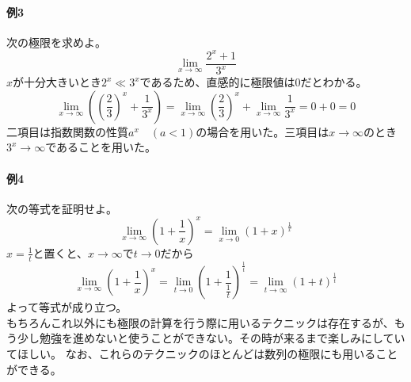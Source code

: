 \documentclass[a4j,dvipdfmx]{jsarticle}
\begin{document}
                \paragraph{例3}次の極限を求めよ。
                    \begin{equation*}
                        \lim_{x\to\infty}\frac{2^x+1}{3^x}
                    \end{equation*}
                    $x$が十分大きいとき$2^x\ll 3^x$であるため、直感的に極限値は0だとわかる。
                    \begin{equation*}
                        \lim_{x\to\infty}\left(\left(\frac{2}{3}\right)^x+\frac{1}{3^x}\right)=\lim_{x\to\infty}\left(\frac{2}{3}\right)^x+\lim_{x\to\infty}\frac{1}{3^x}=0+0=0
                    \end{equation*}
                    二項目は指数関数の性質$a^x\quad(a<1)$の場合を用いた。三項目は$x\to\infty$のとき$3^x\to\infty$であることを用いた。

                \paragraph{例4}次の等式を証明せよ。
                    \begin{equation*}
                        \lim_{x\to \infty}\left(1+\frac{1}{x}\right)^x = \lim_{x\to 0}\left(1+x\right)^\frac{1}{x} 
                    \end{equation*}
                    $x=\frac{1}{t}$と置くと、$x\to\infty$で$t\to0$だから
                    \begin{equation*}
                        \lim_{x\to \infty}\left(1+\frac{1}{x}\right)^x = \lim_{t\to 0}\left(1+\frac{1}{\frac{1}{t}}\right)^\frac{1}{t}=\lim_{t\to\infty}(1+t)^\frac{1}{t}
                    \end{equation*}
                    よって等式が成り立つ。\\

                もちろんこれ以外にも極限の計算を行う際に用いるテクニックは存在するが、もう少し勉強を進めないと使うことができない。その時が来るまで楽しみにしていてほしい。
                なお、これらのテクニックのほとんどは数列の極限にも用いることができる。
            \clearpage
\end{document}
